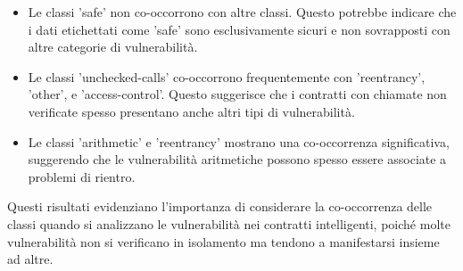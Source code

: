 \documentclass[../../Thesis.tex]{subfiles}
\begin{document}
\begin{itemize}
    \item Le classi 'safe' non co-occorrono con altre classi. Questo potrebbe indicare che i dati etichettati come 'safe' sono esclusivamente sicuri e non sovrapposti con altre categorie di vulnerabilità.
    \item Le classi 'unchecked-calls' co-occorrono frequentemente con 'reentrancy', 'other', e 'access-control'. Questo suggerisce che i contratti con chiamate non verificate spesso presentano anche altri tipi di vulnerabilità.
    \item Le classi 'arithmetic' e 'reentrancy' mostrano una co-occorrenza significativa, suggerendo che le vulnerabilità aritmetiche possono spesso essere associate a problemi di rientro.
\end{itemize}

Questi risultati evidenziano l'importanza di considerare la co-occorrenza delle classi quando si analizzano le vulnerabilità nei contratti intelligenti, poiché molte vulnerabilità non si verificano in isolamento ma tendono a manifestarsi insieme ad altre.
\end{document}

